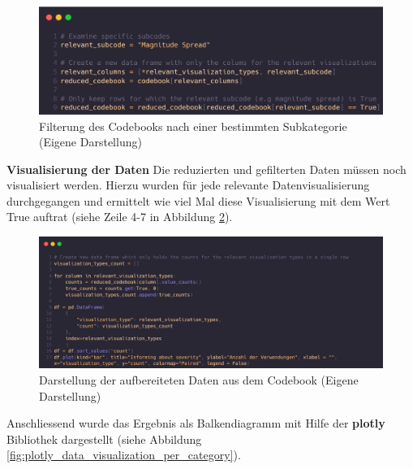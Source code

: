  \begin{figure}[h]
    \includegraphics[width=14cm]{images/jupyter_notebook_data_filtering_subcategory.png}
    \centering
    \caption{Filterung des Codebooks nach einer bestimmten Subkategorie (Eigene Darstellung)}
    \label{fig:jupyter_notebook_data_filtering_subcategory}
\end{figure}

\clearpage
\noindent
\textbf{Visualisierung der Daten}
\newline
\indent
Die reduzierten und gefilterten Daten müssen noch visualisiert werden. Hierzu wurden für jede relevante Datenvisualisierung durchgegangen und ermittelt wie viel Mal diese Visualisierung mit dem Wert True auftrat (siehe Zeile 4-7 in Abbildung \ref{fig:jupyter_notebook_data_visualization}).


\begin{figure}[h]
    \includegraphics[width=14cm]{images/jupyter_notebook_data_visualization.png}
    \centering
    \caption{Darstellung der aufbereiteten Daten aus dem Codebook (Eigene Darstellung)}
    \label{fig:jupyter_notebook_data_visualization}
\end{figure}

Anschliessend wurde das Ergebnis als Balkendiagramm mit Hilfe der \textbf{plotly} Bibliothek dargestellt (siehe Abbildung \ref{fig:plotly_data_visualization_per_category}).

